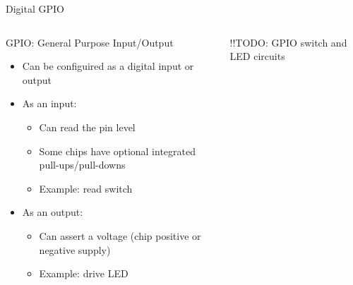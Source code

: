 \documentclass{beamer}
\begin{document}
\begin{frame}{Digital GPIO}
  \begin{columns}[T]
    \begin{column}{.6\textwidth}
      GPIO: General Purpose Input/Output
      \begin{itemize}
        \item Can be configuired as a digital input or output
        \item As an input:
        \begin{itemize}
          \item Can read the pin level
          \item Some chips have optional integrated pull-ups/pull-downs
          \item Example: read switch
        \end{itemize}
        \item As an output:
        \begin{itemize}
          \item Can assert a voltage (chip positive or negative supply)
          \item Example: drive LED
        \end{itemize}
      \end{itemize}
    \end{column}

    \begin{column}{0.4\textwidth}
      !!TODO: GPIO switch and LED circuits
    \end{column}
  \end{columns}
\end{frame}
\end{document}
